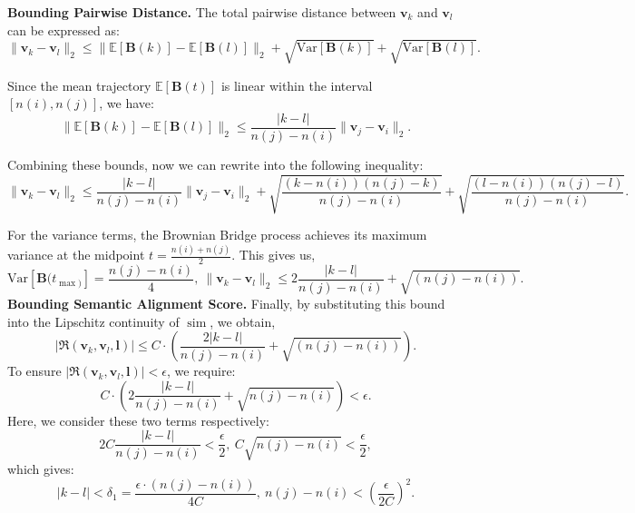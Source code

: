 \noindent \textbf{Bounding Pairwise Distance.} The total pairwise distance between \( \mathbf{v}_k \) and \( \mathbf{v}_l \) can be expressed as:
\[
\|\mathbf{v}_k - \mathbf{v}_l\|_2 \leq \|\mathbb{E}[\mathbf{B}(k)] - \mathbb{E}[\mathbf{B}(l)]\|_2 + \sqrt{ \mathrm{Var}[\mathbf{B}(k)]} + \sqrt{ \mathrm{Var}[\mathbf{B}(l)]}.
\]

Since the mean trajectory \( \mathbb{E}[\mathbf{B}(t)] \) is linear within the interval \([n(i), n(j)]\), we have:
\[
\|\mathbb{E}[\mathbf{B}(k)] - \mathbb{E}[\mathbf{B}(l)]\|_2 \leq \frac{|k - l|}{n(j) - n(i)} \|\mathbf{v}_j - \mathbf{v}_i\|_2.
\]

Combining these bounds, now we can rewrite into the following inequality:
\[
\|\mathbf{v}_k - \mathbf{v}_l\|_2 \leq \frac{|k - l|}{n(j) - n(i)} \|\mathbf{v}_j - \mathbf{v}_i\|_2 + \sqrt{\frac{(k - n(i))(n(j) - k)}{n(j) - n(i)}} + \sqrt{\frac{(l - n(i))(n(j) - l)}{n(j) - n(i)}}.
\]


For the variance terms, the Brownian Bridge process achieves its maximum variance at the midpoint $t=\frac{n(i) + n(j)}{2}$. This gives us,
\[\mathrm{Var}[\mathbf{B}(t_{\operatorname{max})}] = \frac{n(j)-n(i)}{4}, ~
\|\mathbf{v}_k - \mathbf{v}_l\|_2 \leq 2\frac{|k - l|}{n(j) - n(i)} +  \sqrt{ (n(j) - n(i))}.
\]
\noindent \textbf{Bounding Semantic Alignment Score.} Finally, by substituting this bound into the Lipschitz continuity of $\operatorname{sim}$, we obtain,
\[
\left|\mathfrak{R}(\mathbf{v}_k, \mathbf{v}_l, \mathbf{l})\right| \leq C \cdot \left( \frac{2|k - l|}{n(j)-n(i)} + \sqrt{(n(j) - n(i))} \right).
\]
To ensure \( \left|\mathfrak{R}(\mathbf{v}_k, \mathbf{v}_l, \mathbf{l})\right| < \epsilon \), we require:
\[
C \cdot \left( 2\frac{|k - l|}{n(j) - n(i)} + \sqrt{n(j) - n(i)} \right) < \epsilon.
\]
Here, we consider these two terms respectively:
    \[
    2C\frac{|k - l|}{n(j) - n(i)} < \frac{\epsilon}{2},~ C \sqrt{n(j) - n(i)} < \frac{\epsilon}{2},
    \]
    which gives:
    \[
    |k - l| < \delta_1 = \frac{\epsilon \cdot (n(j) - n(i))}{4C},~ n(j) - n(i) < \left(\frac{\epsilon}{2C}\right)^2.
    \]

